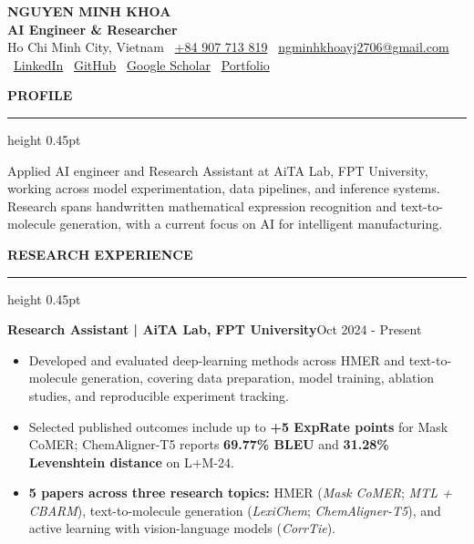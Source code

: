 \documentclass[10pt]{article}
\newcommand{\cvsection}[1]{%
    \vspace{6.2pt}%
    {\color{accent}\bfseries\small #1}\par
    \vspace{2.3pt}%
    {\color{rulegray}\hrule height 0.45pt}\vspace{4.0pt}%
}
\newcommand{\entry}[2]{%
    \textbf{#1}\hfill {\color{muted}\small #2}\par
}
\begin{document}
\begin{center}
    {\LARGE\textbf{NGUYEN MINH KHOA}}\\[-1pt]
    {\color{accent}\textbf{AI Engineer \& Researcher}}\\[3pt]
    {\small Ho Chi Minh City, Vietnam \textbullet\
    \href{tel:+84907713819}{+84 907 713 819} \textbullet\
    \href{mailto:ngminhkhoayj2706@gmail.com}{ngminhkhoayj2706@gmail.com} \textbullet\
    \href{https://www.linkedin.com/in/ngminhkhoa1410}{LinkedIn} \textbullet\
    \href{https://github.com/Purin1410}{GitHub} \textbullet\
    \href{https://scholar.google.com/citations?user=tCq7yoQAAAAJ}{Google Scholar} \textbullet\
    \href{https://purin1410.github.io}{Portfolio}}
\end{center}

\vspace{-2pt}

\cvsection{PROFILE}
Applied AI engineer and Research Assistant at AiTA Lab, FPT University, working across model experimentation, data pipelines, and inference systems. Research spans handwritten mathematical expression recognition and text-to-molecule generation, with a current focus on AI for intelligent manufacturing.

\cvsection{RESEARCH EXPERIENCE}
\entry{Research Assistant | AiTA Lab, FPT University}{Oct 2024 - Present}
\begin{itemize}
    \item Developed and evaluated deep-learning methods across HMER and text-to-molecule generation, covering data preparation, model training, ablation studies, and reproducible experiment tracking.
    \item Selected published outcomes include up to \textbf{+5 ExpRate points} for Mask CoMER; ChemAligner-T5 reports \textbf{69.77\% BLEU} and \textbf{31.28\% Levenshtein distance} on L+M-24.
    \item \textbf{5 papers across three research topics:} HMER (\textit{Mask CoMER}; \textit{MTL + CBARM}), text-to-molecule generation (\textit{LexiChem}; \textit{ChemAligner-T5}), and active learning with vision-language models (\textit{CorrTie}).
\end{itemize}
\end{document}
